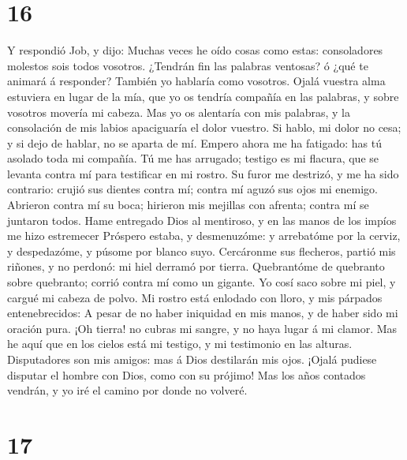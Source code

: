 \hypertarget{section-15}{%
\section{16}\label{section-15}}

 Y respondió Job, y dijo:  Muchas veces he
oído cosas como estas: consoladores molestos sois todos vosotros.
 ¿Tendrán fin las palabras ventosas? ó ¿qué te animará á
responder?  También yo hablaría como vosotros. Ojalá
vuestra alma estuviera en lugar de la mía, que yo os tendría compañía en
las palabras, y sobre vosotros movería mi cabeza.  Mas yo
os alentaría con mis palabras, y la consolación de mis labios
apaciguaría el dolor vuestro.  Si hablo, mi dolor no cesa;
y si dejo de hablar, no se aparta de mí.  Empero ahora me
ha fatigado: has tú asolado toda mi compañía.  Tú me has
arrugado; testigo es mi flacura, que se levanta contra mí para
testificar en mi rostro.  Su furor me destrizó, y me ha
sido contrario: crujió sus dientes contra mí; contra mí aguzó sus ojos
mi enemigo.  Abrieron contra mí su boca; hirieron mis
mejillas con afrenta; contra mí se juntaron todos.  Hame
entregado Dios al mentiroso, y en las manos de los impíos me hizo
estremecer  Próspero estaba, y desmenuzóme: y arrebatóme
por la cerviz, y despedazóme, y púsome por blanco suyo. 
Cercáronme sus flecheros, partió mis riñones, y no perdonó: mi hiel
derramó por tierra.  Quebrantóme de quebranto sobre
quebranto; corrió contra mí como un gigante.  Yo cosí
saco sobre mi piel, y cargué mi cabeza de polvo.  Mi
rostro está enlodado con lloro, y mis párpados entenebrecidos:
 A pesar de no haber iniquidad en mis manos, y de haber
sido mi oración pura.  ¡Oh tierra! no cubras mi sangre, y
no haya lugar á mi clamor.  Mas he aquí que en los cielos
está mi testigo, y mi testimonio en las alturas. 
Disputadores son mis amigos: mas á Dios destilarán mis ojos.
 ¡Ojalá pudiese disputar el hombre con Dios, como con su
prójimo!  Mas los años contados vendrán, y yo iré el
camino por donde no volveré.

\hypertarget{section-16}{%
\section{17}\label{section-16}}

